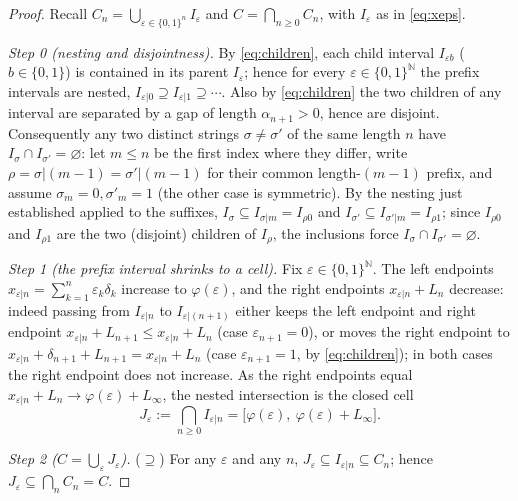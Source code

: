 \documentclass{amsart}
\theoremstyle{definition}
\theoremstyle{remark}
\begin{document}
\begin{proof}
Recall $C_n=\bigcup_{\varepsilon\in\{0,1\}^n}I_\varepsilon$ and
$C=\bigcap_{n\ge0}C_n$, with $I_\varepsilon$ as in \eqref{eq:xeps}.

\smallskip
\emph{Step 0 (nesting and disjointness).}
By \eqref{eq:children}, each child interval $I_{\varepsilon b}$ ($b\in\{0,1\}$) is
contained in its parent $I_\varepsilon$; hence for every
$\varepsilon\in\{0,1\}^{\mathbb N}$ the prefix intervals are nested,
$I_{\varepsilon|0}\supseteq I_{\varepsilon|1}\supseteq\cdots$. Also by
\eqref{eq:children} the two children of any interval are separated by a gap of
length $\alpha_{n+1}>0$, hence are disjoint. Consequently any two distinct strings
$\sigma\ne\sigma'$ of the same length $n$ have $I_\sigma\cap I_{\sigma'}=\varnothing$:
let $m\le n$ be the first index where they differ, write $\rho=\sigma|(m-1)=\sigma'|(m-1)$
for their common length-$(m-1)$ prefix, and assume $\sigma_m=0,\sigma'_m=1$ (the
other case is symmetric). By the nesting just established applied to the suffixes,
$I_\sigma\subseteq I_{\sigma|m}=I_{\rho 0}$ and $I_{\sigma'}\subseteq
I_{\sigma'|m}=I_{\rho 1}$; since $I_{\rho 0}$ and $I_{\rho 1}$ are the two
(disjoint) children of $I_\rho$, the inclusions force $I_\sigma\cap
I_{\sigma'}=\varnothing$.

\smallskip
\emph{Step 1 (the prefix interval shrinks to a cell).}
Fix $\varepsilon\in\{0,1\}^{\mathbb N}$. The left endpoints
$x_{\varepsilon|n}=\sum_{k=1}^{n}\varepsilon_k\delta_k$ increase to
$\varphi(\varepsilon)$, and the right endpoints
$x_{\varepsilon|n}+L_n$ decrease: indeed passing from $I_{\varepsilon|n}$ to
$I_{\varepsilon|(n+1)}$ either keeps the left endpoint and right endpoint
$x_{\varepsilon|n}+L_{n+1}\le x_{\varepsilon|n}+L_n$ (case $\varepsilon_{n+1}=0$),
or moves the right endpoint to $x_{\varepsilon|n}+\delta_{n+1}+L_{n+1}
=x_{\varepsilon|n}+L_n$ (case $\varepsilon_{n+1}=1$, by \eqref{eq:children}); in
both cases the right endpoint does not increase. As the right endpoints equal
$x_{\varepsilon|n}+L_n\to\varphi(\varepsilon)+L_\infty$, the nested intersection is
the closed cell
\begin{equation}\label{eq:cell}
J_\varepsilon:=\bigcap_{n\ge0}I_{\varepsilon|n}
=\bigl[\varphi(\varepsilon),\ \varphi(\varepsilon)+L_\infty\bigr].
\end{equation}

\smallskip
\emph{Step 2 ($C=\bigcup_\varepsilon J_\varepsilon$).}
($\supseteq$) For any $\varepsilon$ and any $n$, $J_\varepsilon\subseteq
I_{\varepsilon|n}\subseteq C_n$; hence $J_\varepsilon\subseteq\bigcap_n C_n=C$.


\end{proof}
\end{document}
